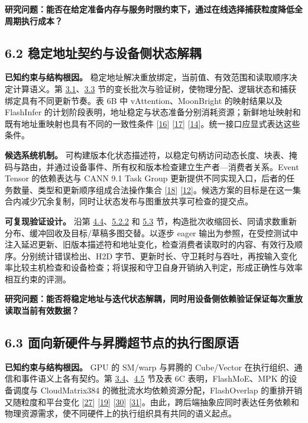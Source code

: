\documentclass[UTF8,10.5pt,fontset=windows]{ctexart}
\begin{document}
\textbf{研究问题：能否在给定准备内存与服务时限约束下，通过在线选择捕获粒度降低全周期执行成本？}

\hypertarget{section-6-2}{%
\subsection{6.2 稳定地址契约与设备侧状态解耦}\label{section-6-2}}

\textbf{已知约束与结构根因。}
稳定地址解决重放绑定，当前值、有效范围和读取顺序决定计算语义。第
\protect\hyperlink{section-3-1}{3.1}、\protect\hyperlink{section-3-3}{3.3}
节的变长批次与验证树，使物理分配、逻辑状态和捕获绑定具有不同更新节奏。表
6B 中 vAttention、MoonBright 的映射结果以及 FlashInfer
的计划阶段表明，地址稳定与状态准备分别消耗资源；新鲜地址映射和既有地址重映射也具有不同的一致性条件
{[}\protect\hyperlink{ref-prabhu2025vattention}{16}{]}
{[}\protect\hyperlink{ref-zhang2026moonbright}{17}{]}
{[}\protect\hyperlink{ref-ye2025flashinfer}{14}{]}。统一接口应显式表达这些条件。

\textbf{候选系统机制。}
可构建版本化状态描述符，以稳定句柄访问动态长度、块表、掩码与路由，并通过设备事件、所有权和版本检查建立生产者---消费者关系。Event
Tensor 的依赖表达与 CANN 9.1 Task Group
更新提供不同实现入口，后者的任务数量、类型和更新顺序组成合法操作集合
{[}\protect\hyperlink{ref-jin2026eventtensor}{18}{]}
{[}\protect\hyperlink{ref-cann910update}{12}{]}。候选方案的目标是在这一集合内减少冗余复制，同时让状态发布与图重放共享可检查的提交点。

\textbf{可复现验证设计。} 沿第
\protect\hyperlink{section-4-4}{4.4}、\protect\hyperlink{section-5-2-2}{5.2.2}
和 \protect\hyperlink{section-5-3}{5.3}
节，构造批次收缩回长、同请求数重新分布、缓冲回收及目标/草稿多图交替。以逐步
eager
输出为参照，在受控测试中注入延迟更新、旧版本描述符和地址变化，检查消费者读取时的内容、有效行及顺序。分别统计错误检出、H2D
字节、更新时长、守卫耗时与吞吐，再按输入变化率比较主机检查和设备检查；将误报和守卫自身开销纳入判定，形成正确性与效率相互约束的评测。

\textbf{研究问题：能否将稳定地址与迭代状态解耦，同时用设备侧依赖验证保证每次重放读取当前有效数据？}

\hypertarget{section-6-3}{%
\subsection{6.3 面向新硬件与昇腾超节点的执行图原语}\label{section-6-3}}

\textbf{已知约束与结构根因。} GPU 的 SM/warp 与昇腾的 Cube/Vector
在执行组织、通信和事件语义上各有契约。第
\protect\hyperlink{section-3-4}{3.4}、\protect\hyperlink{section-4-5}{4.5}
节及表 6C 表明，FlashMoE、MPK 的设备调度与 CloudMatrix384
的微批流水均依赖资源分配，FlashOverlap 的重排开销又随粒度和平台变化
{[}\protect\hyperlink{ref-aimuyo2025flashmoe}{27}{]}
{[}\protect\hyperlink{ref-cheng2026mpk}{19}{]}
{[}\protect\hyperlink{ref-zuo2025cloudmatrix384}{30}{]}
{[}\protect\hyperlink{ref-hong2026flashoverlap}{31}{]}。由此，跨后端抽象应同时表达任务依赖和物理资源需求，使不同硬件上的执行组织具有共同的语义起点。
\end{document}
